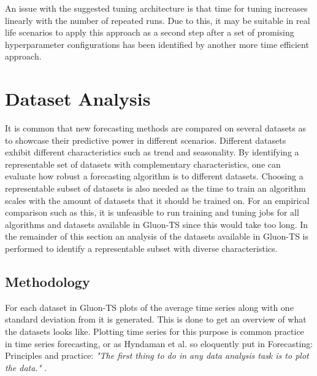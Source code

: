 An issue with the suggested tuning architecture is that time for tuning increases linearly with the number of repeated runs. Due to this, it may be suitable in real life scenarios to apply this approach as a second step after a set of promising hyperparameter configurations has been identified by another more time efficient approach.

\section{Dataset Analysis}
\label{sec:dataset_analysis}
It is common that new forecasting methods are compared on several datasets as to showcase their predictive power in different scenarios. Different datasets exhibit different characteristics such as trend and seasonality. By identifying a representable set of datasets with complementary characteristics, one can evaluate how robust a forecasting algorithm is to different datasets. Choosing a representable subset of datasets is also needed as the time to train an algorithm scales with the amount of datasets that it should be trained on. For an empirical comparison such as this, it is unfeasible to run training and tuning jobs for all algorithms and datasets available in Gluon-TS since this would take too long. In the remainder of this section an analysis of the datasets available in Gluon-TS is performed to identify a representable subset with diverse characteristics.

\subsection{Methodology}

For each dataset in Gluon-TS plots of the average time series along with one standard deviation from it is generated. This is done to get an overview of what the datasets looks like. Plotting time series for this purpose is common practice in time series forecasting, or as Hyndaman et al. so eloquently put in Forecasting: Principles and practice: \textit{"The first thing to do in any data analysis task is to plot the data."} \cite{hyndman_forecasting_3rd}.

